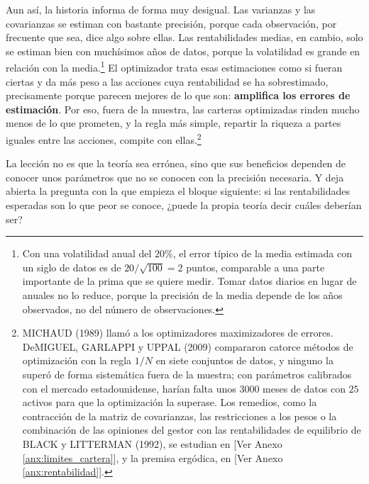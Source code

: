 \documentclass[10pt,a4paper]{article}
\newcommand{\authorfont}[1]{{\fontfamily{EBGaramond-TLF}\selectfont #1}}
\begin{document}
Aun así, la historia informa de forma muy desigual. Las varianzas y las covarianzas se estiman con bastante precisión, porque cada observación, por frecuente que sea, dice algo sobre ellas. Las rentabilidades medias, en cambio, solo se estiman bien con muchísimos años de datos, porque la volatilidad es grande en relación con la media.\footnote{%
    Con una volatilidad anual del $20\%$, el error típico de la media estimada con un siglo de datos es de $20/\sqrt{100}=2$ puntos, comparable a una parte importante de la prima que se quiere medir. Tomar datos diarios en lugar de anuales no lo reduce, porque la precisión de la media depende de los años observados, no del número de observaciones.
} El optimizador trata esas estimaciones como si fueran ciertas y da más peso a las acciones cuya rentabilidad se ha sobrestimado, precisamente porque parecen mejores de lo que son: \textbf{amplifica los errores de estimación}. Por eso, fuera de la muestra, las carteras optimizadas rinden mucho menos de lo que prometen, y la regla más simple, repartir la riqueza a partes iguales entre las acciones, compite con ellas.\footnote{%
    MICHAUD (1989) llamó a los optimizadores maximizadores de errores. DeMIGUEL, GARLAPPI y UPPAL (2009) compararon catorce métodos de optimización con la regla $1/N$ en siete conjuntos de datos, y ninguno la superó de forma sistemática fuera de la muestra; con parámetros calibrados con el mercado estadounidense, harían falta unos $3000$ meses de datos con $25$ activos para que la optimización la superase. Los remedios, como la contracción de la matriz de covarianzas, las restricciones a los pesos o la combinación de las opiniones del gestor con las rentabilidades de equilibrio de BLACK y LITTERMAN (1992), se estudian en [\authorfont{Ver Anexo \ref{anx:limites_cartera}}], y la premisa ergódica, en [\authorfont{Ver Anexo \ref{anx:rentabilidad}}].
} 

La lección no es que la teoría sea errónea, sino que sus beneficios dependen de conocer unos parámetros que no se conocen con la precisión necesaria. Y deja abierta la pregunta con la que empieza el bloque siguiente: si las rentabilidades esperadas son lo que peor se conoce, ¿puede la propia teoría decir cuáles deberían ser?













\clearpage
\end{document}
